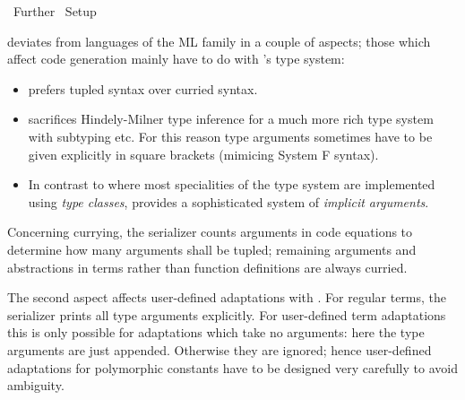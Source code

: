 %
\begin{isabellebody}%
\def\isabellecontext{Further}%
%
\isadelimtheory
%
\endisadelimtheory
%
\isatagtheory
{}\isamarkupfalse%
\ Further\isanewline
{}\ Setup\isanewline
{}%
\endisatagtheory
{\isafoldtheory}%
%
\isadelimtheory
%
\endisadelimtheory
%
\isamarkuptrue%
%
\isamarkuptrue%
%
\begin{isamarkuptext}%
 deviates from languages of the ML family in a couple
  of aspects; those which affect code generation mainly have to do with
  's type system:

  \begin{itemize}

    \item {} prefers tupled syntax over curried syntax.

    \item {} sacrifices Hindely-Milner type inference for a
      much more rich type system with subtyping etc.  For this reason
      type arguments sometimes have to be given explicitly in square
      brackets (mimicing System F syntax).

    \item In contrast to  where most specialities of
      the type system are implemented using \emph{type classes},
       provides a sophisticated system of \emph{implicit
      arguments}.

  \end{itemize}

  \noindent Concerning currying, the  serializer counts
  arguments in code equations to determine how many arguments
  shall be tupled; remaining arguments and abstractions in terms
  rather than function definitions are always curried.

  The second aspect affects user-defined adaptations with \hyperlink{command.code-const}{\mbox{}}.  For regular terms, the  serializer prints
  all type arguments explicitly.  For user-defined term adaptations
  this is only possible for adaptations which take no arguments: here
  the type arguments are just appended.  Otherwise they are ignored;
  hence user-defined adaptations for polymorphic constants have to be
  designed very carefully to avoid ambiguity.


\end{isamarkuptext}
\end{isabellebody}
